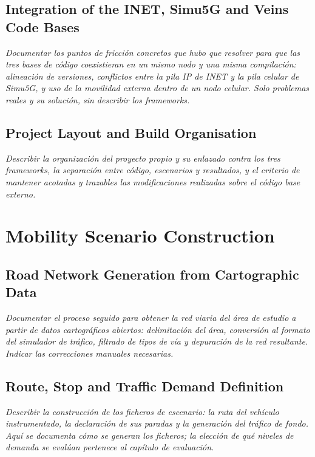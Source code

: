 \subsection{Integration of the INET, Simu5G and Veins Code Bases}
\emph{Documentar los puntos de fricción concretos que hubo que resolver para que
las tres bases de código coexistieran en un mismo nodo y una misma compilación:
alineación de versiones, conflictos entre la pila IP de INET y la pila celular de
Simu5G, y uso de la movilidad externa dentro de un nodo celular. Solo problemas
reales y su solución, sin describir los frameworks.}

\subsection{Project Layout and Build Organisation}
\emph{Describir la organización del proyecto propio y su enlazado contra los tres
frameworks, la separación entre código, escenarios y resultados, y el criterio de
mantener acotadas y trazables las modificaciones realizadas sobre el código base
externo.}

\section{Mobility Scenario Construction}

\subsection{Road Network Generation from Cartographic Data}
\emph{Documentar el proceso seguido para obtener la red viaria del área de
estudio a partir de datos cartográficos abiertos: delimitación del área,
conversión al formato del simulador de tráfico, filtrado de tipos de vía y
depuración de la red resultante. Indicar las correcciones manuales necesarias.}

\subsection{Route, Stop and Traffic Demand Definition}
\emph{Describir la construcción de los ficheros de escenario: la ruta del
vehículo instrumentado, la declaración de sus paradas y la generación del tráfico
de fondo. Aquí se documenta cómo se generan los ficheros; la elección de qué
niveles de demanda se evalúan pertenece al capítulo de evaluación.}

